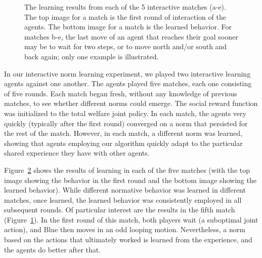 \begin{figure}
\begin{subfigure}[b]{0.18\textwidth}
        \caption{}
        \label{fig:inter5}
    \end{subfigure}
    \caption{The learning results from each of the 5 interactive matches (a-e). The top image for a match is the first round of interaction of the agents. The bottom image for a match is the learned behavior. For matches b-e, the last move of an agent that reaches their goal sooner may be to wait for two steps, or to move north and/or south and back again; only one example is illustrated.}\label{fig:interRes}
\end{figure}

In our interactive norm learning experiment,
we played two interactive learning agents against one another.  The
agents played five matches, each one consisting of five rounds.  Each
match began fresh, without any knowledge of previous matches, to see
whether different norms could emerge.  The social reward function was
initialized to the total welfare joint policy.  In each match, the
agents very quickly (typically after the first round) converged on a
norm that persisted for the rest of the match.  However, in each
match, a different norm was learned, showing that agents employing our
algorithm quickly adapt to the particular shared experience they have
with other agents.

Figure~\ref{fig:interRes} shows the results of learning in each of the
five matches (with the top image showing the behavior in the first
round and the bottom image showing the learned behavior). While
different normative behavior was learned in different matches, once
learned, the learned behavior was consistently employed in all
subsequent rounds.  Of particular interest are the results in the
fifth match (Figure~\ref{fig:inter5}). In the first round of this
match, both players wait (a suboptimal joint action), and Blue then
moves in an odd looping motion. Nevertheless, a norm based on the
actions that ultimately worked is learned from the experience, and the
agents do better after that.
